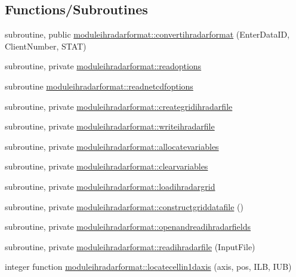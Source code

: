 \subsection*{Functions/\+Subroutines}
\begin{DoxyCompactItemize}
\item 
subroutine, public \mbox{\hyperlink{namespacemoduleihradarformat_a98ed94c78a186e13367d60ca010104fb}{moduleihradarformat\+::convertihradarformat}} (Enter\+Data\+ID, Client\+Number, S\+T\+AT)
\item 
subroutine, private \mbox{\hyperlink{namespacemoduleihradarformat_aee7099f1405740714bd8905f16b2c9bf}{moduleihradarformat\+::readoptions}}
\item 
subroutine \mbox{\hyperlink{namespacemoduleihradarformat_a11ef1762e3ede5825ed4cfa4192378d3}{moduleihradarformat\+::readnetcdfoptions}}
\item 
subroutine, private \mbox{\hyperlink{namespacemoduleihradarformat_ada390827dfd90ffece67dfc0ddc1a1af}{moduleihradarformat\+::creategridihradarfile}}
\item 
subroutine, private \mbox{\hyperlink{namespacemoduleihradarformat_a159e87b28314bc4e1c2d025679d954ff}{moduleihradarformat\+::writeihradarfile}}
\item 
subroutine, private \mbox{\hyperlink{namespacemoduleihradarformat_a5e6d5ce963365079322d81b8c5030265}{moduleihradarformat\+::allocatevariables}}
\item 
subroutine, private \mbox{\hyperlink{namespacemoduleihradarformat_a1116a7a33c3cd3f0002a36a069bd6df9}{moduleihradarformat\+::clearvariables}}
\item 
subroutine, private \mbox{\hyperlink{namespacemoduleihradarformat_a3b96dd949bf780f8b1d2d5d3818dda48}{moduleihradarformat\+::loadihradargrid}}
\item 
subroutine, private \mbox{\hyperlink{namespacemoduleihradarformat_a02661cf4395883e003f6785721da99e9}{moduleihradarformat\+::constructgriddatafile}} ()
\item 
subroutine, private \mbox{\hyperlink{namespacemoduleihradarformat_a1ddc10c28e0f93952a3e8c21ab4b9e37}{moduleihradarformat\+::openandreadihradarfields}}
\item 
subroutine, private \mbox{\hyperlink{namespacemoduleihradarformat_adb71a6554853412cfc2f930bf2a31f3a}{moduleihradarformat\+::readihradarfile}} (Input\+File)
\item 
integer function \mbox{\hyperlink{namespacemoduleihradarformat_a940aa69f596041c70dab62721c97072f}{moduleihradarformat\+::locatecellin1daxis}} (axis, pos, I\+LB, I\+UB)

\end{DoxyCompactItemize}
